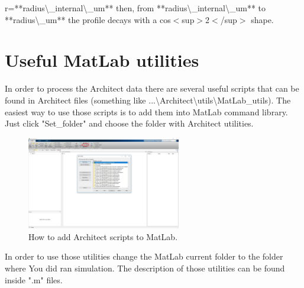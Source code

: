 \documentclass[12pt,a4paper]{article}
\begin{document}
\begin{itemize}
{\begin{itemize}
{	r=**radius\textbackslash\_internal\textbackslash\_um** then, from **radius\textbackslash\_internal\textbackslash\_um** to **radius\textbackslash\_um** the 		profile 		decays with a cos$<$sup$>$2$<$/sup$>$ shape. }
	\end{itemize}
}
\end{itemize}



\section{Useful MatLab utilities}

In order to process the Architect data there are several useful scripts that can be found in Architect files (something like ...\textbackslash Architect\textbackslash utils\textbackslash MatLab\_utils). The easiest way to use those scripts is to add them into MatLab command library. Just click "Set\_folder" and choose the folder with Architect utilities.
\begin{figure}[h]
\centering
\includegraphics[width=0.6\textwidth]{Set_folder_MathLab.jpg}
\caption{How to add Architect scripts to MatLab.}
\label{fig4}
\end{figure}

In order to use those utilities change the MatLab current folder to the folder where You did ran simulation. The description of those utilities can be found inside ".m" files.
\end{document}

